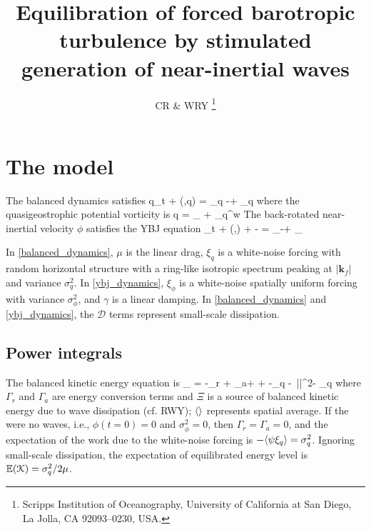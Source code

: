 \documentclass[12pt]{article}
\newcommand{\D}{\mathcal{D}}
\newcommand{\disp}{\eta}
\newcommand{\ze}{\zeta}
\newcommand{\Ep}{\mathbb{E}}
\begin{document}
\title{Equilibration of forced barotropic turbulence by stimulated generation
of near-inertial waves}

\author{
CR  \& WRY \thanks {Scripps Institution of Oceanography,
University of California at San Diego, La Jolla, CA
92093--0230, USA.
}
}


\maketitle

\section{The model}
The balanced dynamics satisfies
\beq
q_t + \sJ(\psi,q)  = \xi_q -\mu \zeta + \D_q \com
\label{balanced_dynamics}
\eeq
where the quasigeostrophic potential vorticity is
\beq
\label{qgpv}
q = \underbrace{\lap \psi}_{ \zeta} +
                _{ q^w}\per
\eeq
The back-rotated near-inertial velocity $\phi$ satisfies the
YBJ equation
\beq
\phi_t + \sJ(\psi,\phi) +  \phi {}\ze -  \disp \lap \phi
 = \xi_\phi -\gamma \phi + \D_\phi\per
 \label{ybj_dynamics}
\eeq

In \eqref{balanced_dynamics}, $\mu$ is the linear drag, $\xi_q$ is a white-noise forcing
with random horizontal structure with a ring-like isotropic spectrum peaking at $|\mathbf{k}_f|$
and variance $\sigma^2_q$.
In \eqref{ybj_dynamics}, $\xi_\phi$ is a white-noise spatially uniform forcing with
variance $\sigma^2_\phi$, and $\gamma$
is a linear damping. In \eqref{balanced_dynamics} and \eqref{ybj_dynamics}, the $\D$ terms represent
small-scale dissipation.

\subsection{Power integrals}

The balanced kinetic energy equation is
\beq
{} \underbrace{\half \la |\nabla \psi|^2 \ra}_{ \K} = -\la\Gamma_r + \Gamma_a\ra + \Xi +
 -\la \psi \xi_q \ra -\ \mu \la|\nabla\psi|^2\ra - \la\psi\D_q\ra\com
\label{Ke}
\eeq
where $\Gamma_r$ and $\Gamma_a$ are energy conversion terms and $\Xi$ is a source of balanced kinetic energy
due to wave dissipation (cf. RWY); $\langle \rangle$ represents spatial average.
If the were no waves, i.e., $\phi(t=0)=0$ and $\sigma_\phi^2=0$,  then $\Gamma_r=\Gamma_a = 0$, and the expectation of the work due to the white-noise forcing
is $-\langle\psi\xi_q\rangle = \sigma_q^2$. Ignoring small-scale dissipation, the expectation of equilibrated energy level
is $\Ep(\K) = \sigma_q^2/2\mu$.
\end{document}
